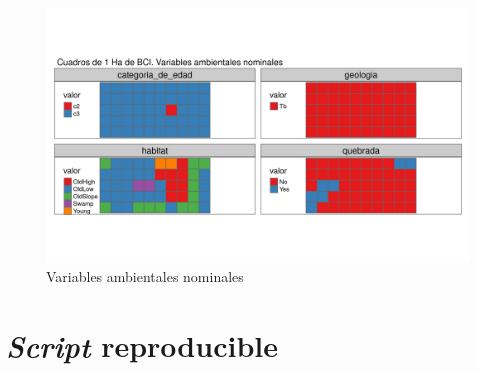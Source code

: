 \documentclass[11pt,]{article}
\begin{document}
\begin{figure}
\centering
\includegraphics[width=1.10000\textwidth]{mapas_variables_ambientales_nominales_tmap.png}
\caption{\label{fig:soporte1} Variables ambientales nominales}
\end{figure}

\section{\texorpdfstring{\emph{Script}
reproducible}{Script reproducible}}\label{script-reproducible}
\end{document}
